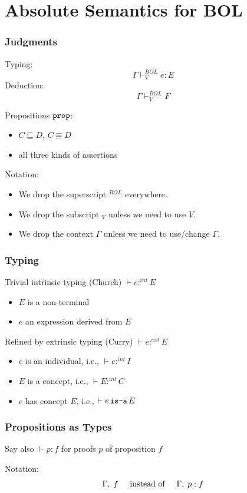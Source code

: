 \section{Absolute Semantics for BOL}

\begin{frame}\frametitle{Judgments}
Typing:  \[\Gamma\vdash^{BOL}_V e:E\]
Deduction: \[\Gamma\vdash^{BOL}_V F\]

Propositions $\mathtt{prop}$:
\begin{itemize}
\item $C\sqsubseteq D$, $C\Equiv D$
\item all three kinds of assertions
\end{itemize}

Notation:
\begin{itemize}
\item We drop the superscript $^{BOL}$ everywhere.
\item We drop the subscript $_V$ unless we need to use $V$.
\item We drop the context $\Gamma$ unless we need to use/change $\Gamma$.
\end{itemize}
\end{frame}

\begin{frame}\frametitle{Typing}
Trivial intrinsic typing (Church) $\vdash e:^{int} E$
\begin{itemize}
\item $E$ is a non-terminal
\item $e$ an expression derived from $E$
\end{itemize}
\medskip

Refined by extrinsic typing (Curry) $\vdash e :^{ext} E$
\begin{itemize}
\item $e$ is an individual, i.e., $\vdash e :^{int} I$
\item $E$ is a concept, i.e., $\vdash E :^{int} C$
\item $e$ has concept $E$, i.e., $\vdash e \mathop{\texttt{is-a}} E$
\end{itemize}
\end{frame}

\begin{frame}\frametitle{Propositions as Types}
Say also $\vdash p:f$ for proofs $p$ of proposition $f$
\medskip

Notation:
\[\Gamma,\; f \hspace*{.5cm}\text{instead of} \hspace*{.5cm} \Gamma,\;p:f\]
\end{frame}

